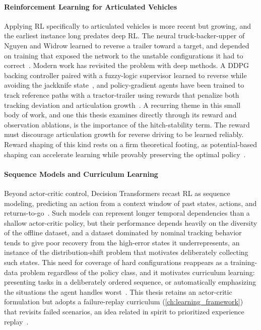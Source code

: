\paragraph{Reinforcement Learning for Articulated Vehicles}
Applying RL specifically to articulated vehicles is more recent but growing, and the earliest instance long predates deep RL. The neural truck-backer-upper of Nguyen and Widrow learned to reverse a trailer toward a target, and depended on training that exposed the network to the unstable configurations it had to correct~\cite{nguyen1990truck}. Modern work has revisited the problem with deep methods. A DDPG backing controller paired with a fuzzy-logic supervisor learned to reverse while avoiding the jackknife state~\cite{bejar2018backing}, and policy-gradient agents have been trained to track reference paths with a tractor-trailer using rewards that penalize both tracking deviation and articulation growth~\cite{kang2024tractortrailer}. A recurring theme in this small body of work, and one this thesis examines directly through its reward and observation ablations, is the importance of the hitch-stability term. The reward must discourage articulation growth for reverse driving to be learned reliably. Reward shaping of this kind rests on a firm theoretical footing, as potential-based shaping can accelerate learning while provably preserving the optimal policy~\cite{ng1999shaping}.

\paragraph{Sequence Models and Curriculum Learning}
Beyond actor-critic control, Decision Transformers recast RL as sequence modeling, predicting an action from a context window of past states, actions, and returns-to-go~\cite{chen2021decision}. Such models can represent longer temporal dependencies than a shallow actor-critic policy, but their performance depends heavily on the diversity of the offline dataset, and a dataset dominated by nominal tracking behavior tends to give poor recovery from the high-error states it underrepresents, an instance of the distribution-shift problem that motivates deliberately collecting such states. This need for coverage of hard configurations reappears as a training-data problem regardless of the policy class, and it motivates curriculum learning: presenting tasks in a deliberately ordered sequence, or automatically emphasizing the situations the agent handles worst~\cite{bengio2009curriculum, narvekar2020curriculum}. This thesis retains an actor-critic formulation but adopts a failure-replay curriculum (\cref{ch:learning_framework}) that revisits failed scenarios, an idea related in spirit to prioritized experience replay~\cite{schaul2016per}.

